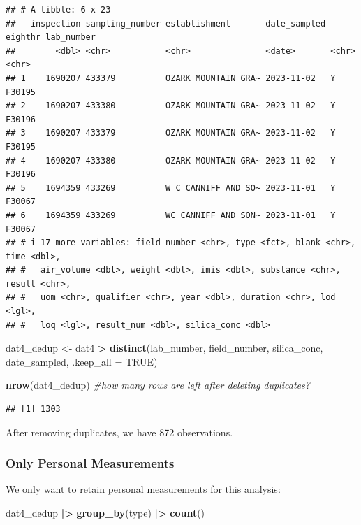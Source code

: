 \documentclass[
]{article}
\newenvironment{Shaded}{\begin{snugshade}}{\end{snugshade}}
\newcommand{\AttributeTok}[1]{\textcolor[rgb]{0.13,0.29,0.53}{#1}}
\newcommand{\CommentTok}[1]{\textcolor[rgb]{0.56,0.35,0.01}{\textit{#1}}}
\newcommand{\ConstantTok}[1]{\textcolor[rgb]{0.56,0.35,0.01}{#1}}
\newcommand{\FunctionTok}[1]{\textcolor[rgb]{0.13,0.29,0.53}{\textbf{#1}}}
\newcommand{\NormalTok}[1]{#1}
\newcommand{\OtherTok}[1]{\textcolor[rgb]{0.56,0.35,0.01}{#1}}
\newcommand{\SpecialCharTok}[1]{\textcolor[rgb]{0.81,0.36,0.00}{\textbf{#1}}}
\begin{document}
\begin{verbatim}
## # A tibble: 6 x 23
##   inspection sampling_number establishment       date_sampled eighthr lab_number
##        <dbl> <chr>           <chr>               <date>       <chr>   <chr>     
## 1    1690207 433379          OZARK MOUNTAIN GRA~ 2023-11-02   Y       F30195    
## 2    1690207 433380          OZARK MOUNTAIN GRA~ 2023-11-02   Y       F30196    
## 3    1690207 433379          OZARK MOUNTAIN GRA~ 2023-11-02   Y       F30195    
## 4    1690207 433380          OZARK MOUNTAIN GRA~ 2023-11-02   Y       F30196    
## 5    1694359 433269          W C CANNIFF AND SO~ 2023-11-01   Y       F30067    
## 6    1694359 433269          WC CANNIFF AND SON~ 2023-11-01   Y       F30067    
## # i 17 more variables: field_number <chr>, type <fct>, blank <chr>, time <dbl>,
## #   air_volume <dbl>, weight <dbl>, imis <dbl>, substance <chr>, result <chr>,
## #   uom <chr>, qualifier <chr>, year <dbl>, duration <chr>, lod <lgl>,
## #   loq <lgl>, result_num <dbl>, silica_conc <dbl>
\end{verbatim}

\begin{Shaded}
\begin{Highlighting}[]
\NormalTok{dat4\_dedup }\OtherTok{\textless{}{-}}\NormalTok{ dat4}\SpecialCharTok{|\textgreater{}} 
  \FunctionTok{distinct}\NormalTok{(lab\_number, field\_number, silica\_conc, date\_sampled, }
           \AttributeTok{.keep\_all =} \ConstantTok{TRUE}\NormalTok{) }

\FunctionTok{nrow}\NormalTok{(dat4\_dedup) }\CommentTok{\#how many rows are left after deleting duplicates? }
\end{Highlighting}
\end{Shaded}

\begin{verbatim}
## [1] 1303
\end{verbatim}

After removing duplicates, we have 872 observations.

\subsubsection{Only Personal
Measurements}\label{only-personal-measurements}

We only want to retain personal measurements for this analysis:

\begin{Shaded}
\begin{Highlighting}[]
\NormalTok{dat4\_dedup }\SpecialCharTok{|\textgreater{}} 
  \FunctionTok{group\_by}\NormalTok{(type) }\SpecialCharTok{|\textgreater{}} 
  \FunctionTok{count}\NormalTok{() }
\end{Highlighting}
\end{Shaded}
\end{document}
